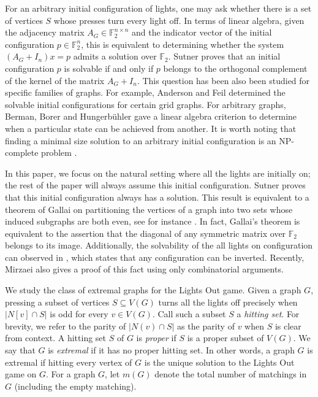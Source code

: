 \documentclass{amsart}
\theoremstyle{definition}
\theoremstyle{remark}
\def\FF{\mathbb{F}}
\begin{document}
For an arbitrary initial configuration of lights, one may ask whether there is a set of vertices $S$ whose presses turn every light off. In terms of linear algebra, given the adjacency matrix $A_G \in \FF_2^{n\times n}$ and the indicator vector of the initial configuration $p \in \FF_2^n$, this is equivalent to determining whether the system $(A_G + I_n)x = p$ admits a solution over $\FF_2$. Sutner \cite[Thm. 3.1]{Sutner89} proves that an initial configuration $p$ is solvable if and only if $p$ belongs to the orthogonal complement of the kernel of the matrix $A_G+I_n$. This question has been also been studied for specific families of graphs. For example, Anderson and Feil \cite{anderson1998turning} determined the solvable initial configurations for certain grid graphs. For arbitrary graphs, Berman, Borer and Hungerbühler \cite{berman2021lights} gave a linear algebra criterion to determine when a particular state can be achieved from another. It is worth noting that finding a minimal size solution to an arbitrary initial configuration is an NP-complete problem \cite[Thm. 3.2]{Sutner88}. 

In this paper, we focus on the natural setting where all the lights are initially on; the rest of the paper will always assume this initial configuration. Sutner \cite[Thm. 3.2]{Sutner89} proves that this initial configuration always has a solution. This result is equivalent to a theorem of Gallai on partitioning the vertices of a graph into two sets whose induced subgraphs are both even, see for instance \cite{Caro96}. In fact, Gallai's theorem is equivalent to the assertion that the diagonal of any symmetric matrix over $\FF_2$ belongs to its image. Additionally, the solvability of the all lights on configuration can observed in \cite[Thm. 5]{berman2021lights}, which states that any configuration can be inverted. Recently, Mirzaei \cite{mirzaei2025inductive} also gives a proof of this fact using only combinatorial arguments.

We study the class of extremal graphs for the Lights Out game. Given a graph $G$, pressing a subset of vertices $S \subseteq V(G)$ turns all the lights off precisely when $|N[v]\cap S|$ is odd for every $v\in V(G)$. Call such a subset $S$ a \textit{hitting set}. For brevity, we refer to the parity of $|N(v) \cap S|$ as the parity of $v$ when $S$ is clear from context. A hitting set $S$ of $G$ is \textit{proper} if $S$ is a proper subset of $V(G)$. We say that $G$ is \textit{extremal} if it has no proper hitting set. In other words, a graph $G$ is extremal if hitting every vertex of $G$ is the unique solution to the Lights Out game on $G$. For a graph $G$, let $m(G)$ denote the total number of matchings in $G$ (including the empty matching). 
\end{document}
